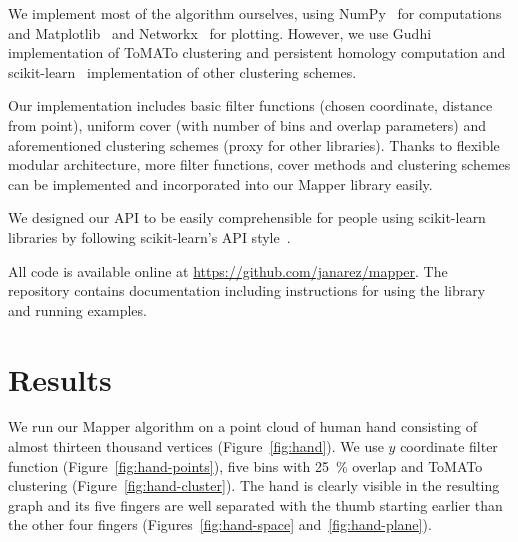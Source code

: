 \documentclass{article}
\begin{document}
We implement most of the algorithm ourselves, using NumPy~\cite{numpy} for computations and Matplotlib~\cite{matplotlib} and Networkx~\cite{networkx} for plotting.
However, we use Gudhi~\cite{gudhi} implementation of ToMATo clustering and persistent homology computation and scikit-learn~\cite{scikit} implementation of other clustering schemes.

Our implementation includes basic filter functions (chosen coordinate, distance from point), uniform cover (with number of bins and overlap parameters) and aforementioned clustering schemes (proxy for other libraries).
Thanks to flexible modular architecture, more filter functions, cover methods and clustering schemes can be implemented and incorporated into our Mapper library easily.

We designed our API to be easily comprehensible for people using scikit-learn libraries by following scikit-learn's API style~\cite{scikitAPI}.

All code is available online at \url{https://github.com/janarez/mapper}.
The repository contains documentation including instructions for using the library and running examples.

\section{Results}\label{sec:res}

We run our Mapper algorithm on a point cloud of human hand consisting of almost thirteen thousand vertices (Figure~\ref{fig:hand}).
We use $y$ coordinate filter function (Figure~\ref{fig:hand-points}), five bins with 25~\% overlap and ToMATo clustering (Figure~\ref{fig:hand-cluster}).
The hand is clearly visible in the resulting graph and its five fingers are well separated with the thumb starting earlier than the other four fingers (Figures~\ref{fig:hand-space} and~\ref{fig:hand-plane}).
\end{document}
